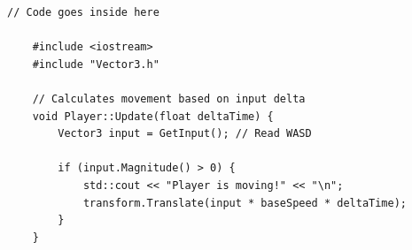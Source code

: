 \begin{lstlisting}[caption=code.cpp]
	// Code goes inside here
	
	#include <iostream>
	#include "Vector3.h"
	
	// Calculates movement based on input delta
	void Player::Update(float deltaTime) {
		Vector3 input = GetInput(); // Read WASD
		
		if (input.Magnitude() > 0) {
			std::cout << "Player is moving!" << "\n";
			transform.Translate(input * baseSpeed * deltaTime);
		}
	}
\end{lstlisting}